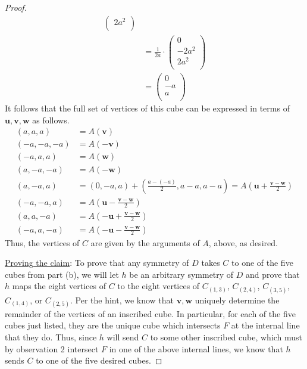 \documentclass[../psets.tex]{subfiles}
\begin{document}
\begin{enumerate}
\begin{enumerate}
\begin{proof}
\begin{align*}
\begin{pmatrix}
                    2a^2\\
                \end{pmatrix}\\
                &= \frac{1}{2a}\cdot
                \begin{pmatrix}
                    0\\
                    -2a^2\\
                    2a^2\\
                \end{pmatrix}\\
                &=
                \begin{pmatrix}
                    0\\
                    -a\\
                    a\\
                \end{pmatrix}
            \end{align*}
            It follows that the full set of vertices of this cube can be expressed in terms of $\mathbf{u},\mathbf{v},\mathbf{w}$ as follows.
            \begin{align*}
                (a,a,a) &= A(\mathbf{v})\\
                (-a,-a,-a) &= A(-\mathbf{v})\\
                (-a,a,a) &= A(\mathbf{w})\\
                (a,-a,-a) &= A(-\mathbf{w})\\
                (a,-a,a) &= (0,-a,a)+\left( \frac{a-(-a)}{2},a-a,a-a \right)
                    = A\left( \mathbf{u}+\frac{\mathbf{v}-\mathbf{w}}{2} \right)\\
                (-a,-a,a) &= A\left( \mathbf{u}-\frac{\mathbf{v}-\mathbf{w}}{2} \right)\\
                (a,a,-a) &= A\left( -\mathbf{u}+\frac{\mathbf{v}-\mathbf{w}}{2} \right)\\
                (-a,a,-a) &= A\left( -\mathbf{u}-\frac{\mathbf{v}-\mathbf{w}}{2} \right)
            \end{align*}
            Thus, the vertices of $C$ are given by the arguments of $A$, above, as desired.\par\smallskip
            \underline{Proving the claim}: To prove that any symmetry of $D$ takes $C$ to one of the five cubes from part (b), we will let $h$ be an arbitrary symmetry of $D$ and prove that $h$ maps the eight vertices of $C$ to the eight vertices of $C_{(1,3)}$, $C_{(2,4)}$, $C_{(3,5)}$, $C_{(1,4)}$, or $C_{(2,5)}$. Per the hint, we know that $\mathbf{v},\mathbf{w}$ uniquely determine the remainder of the vertices of an inscribed cube. In particular, for each of the five cubes just listed, they are the unique cube which intersects $F$ at the internal line that they do. Thus, since $h$ will send $C$ to some other inscribed cube, which must by observation 2 intersect $F$ in one of the above internal lines, we know that $h$ sends $C$ to one of the five desired cubes.

\end{proof}
\end{enumerate}
\end{enumerate}
\end{document}
